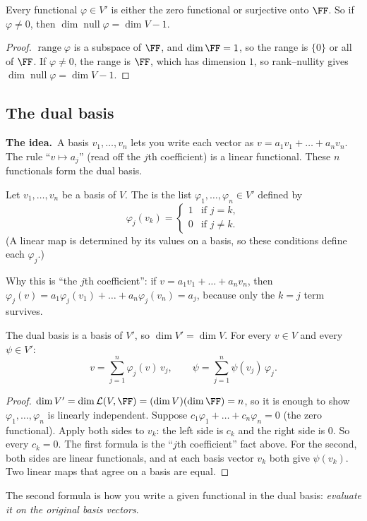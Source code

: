 \documentclass[10pt]{scrartcl}
\DeclareMathOperator{\nul}{null}
\DeclareMathOperator{\range}{range}
\newcommand{\LL}{\mathcal L}
\newcommand{\idea}{\par\noindent\textbf{\color{MidnightBlue}The idea.}\ }
\begin{document}
\begin{proposition*}[HW5 P3]
  Every functional $\varphi\in V'$ is either the zero functional or surjective onto $\FF$. So if $\varphi\ne0$, then $\dim\nul\varphi=\dim V-1$.
\end{proposition*}
\begin{proof}
  $\range\varphi$ is a subspace of $\FF$, and $\dim\FF=1$, so the range is $\{0\}$ or all of $\FF$. If $\varphi\ne0$, the range is $\FF$, which has dimension $1$, so rank--nullity gives $\dim\nul\varphi=\dim V-1$.
\end{proof}

\subsection{The dual basis}
\idea A basis $v_1,\dots,v_n$ lets you write each vector as $v=a_1v_1+\dots+a_nv_n$. The rule ``$v\mapsto a_j$'' (read off the $j$th coefficient) is a linear functional. These $n$ functionals form the dual basis.

\begin{definition*}[Def.~27]
  Let $v_1,\dots,v_n$ be a basis of $V$. The  is the list $\varphi_1,\dots,\varphi_n\in V'$ defined by
  \[ \varphi_j(v_k)=\begin{cases}1&\text{if }j=k,\\0&\text{if }j\ne k.\end{cases} \]
  (A linear map is determined by its values on a basis, so these conditions define each $\varphi_j$.)
\end{definition*}
Why this is ``the $j$th coefficient'': if $v=a_1v_1+\dots+a_nv_n$, then $\varphi_j(v)=a_1\varphi_j(v_1)+\dots+a_n\varphi_j(v_n)=a_j$, because only the $k=j$ term survives.

\begin{proposition*}
  The dual basis is a basis of $V'$, so $\dim V'=\dim V$. For every $v\in V$ and every $\psi\in V'$:
  \[ v=\sum_{j=1}^n\varphi_j(v)\,v_j,\qquad \psi=\sum_{j=1}^n\psi(v_j)\,\varphi_j. \]
\end{proposition*}
\begin{proof}
  $\dim V'=\dim\LL(V,\FF)=(\dim V)(\dim\FF)=n$, so it is enough to show $\varphi_1,\dots,\varphi_n$ is linearly independent. Suppose $c_1\varphi_1+\dots+c_n\varphi_n=0$ (the zero functional). Apply both sides to $v_k$: the left side is $c_k$ and the right side is $0$. So every $c_k=0$.
  The first formula is the ``$j$th coefficient'' fact above. For the second, both sides are linear functionals, and at each basis vector $v_k$ both give $\psi(v_k)$. Two linear maps that agree on a basis are equal.
\end{proof}
The second formula is how you write a given functional in the dual basis: \emph{evaluate it on the original basis vectors}.
\end{document}
